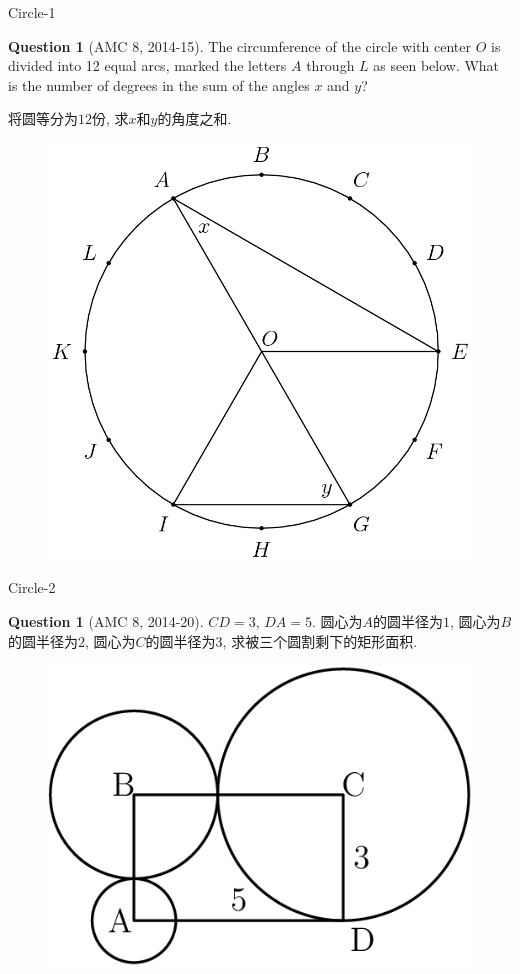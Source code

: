 \documentclass{beamer}
\theoremstyle{definition}
\newtheorem{ques}[defn]{Question}
\begin{document}
\begin{frame}{Circle-1}
    \begin{ques}[AMC 8, 2014-15]
        The circumference of the circle with center $O$ is divided into 12 equal arcs, marked the letters $A$ through $L$ as seen below. What is the number of degrees in the sum of the angles $x$ and $y$?

        将圆等分为$12$份, 求$x$和$y$的角度之和.
    \end{ques}
    \begin{figure}
        \includegraphics[height=0.4\textheight]{circle2.png}
    \end{figure}
\end{frame}
\begin{frame}{Circle-2}
    \begin{ques}[AMC 8, 2014-20]
        $CD=3$, $DA=5$. 圆心为$A$的圆半径为$1$, 圆心为$B$的圆半径为$2$, 圆心为$C$的圆半径为$3$, 求被三个圆割剩下的矩形面积.
    \end{ques}
    \begin{figure}
        \includegraphics[height=0.4\textheight]{circle3.png}
    \end{figure}
\end{frame}
\end{document}
